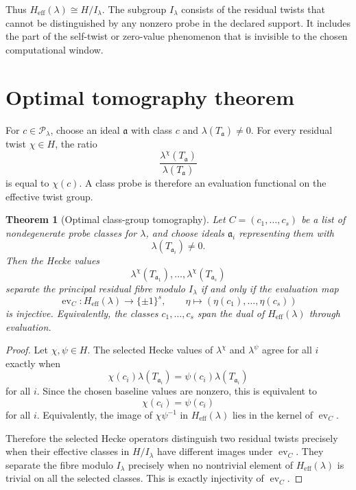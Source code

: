 \documentclass[11pt]{article}
\newtheorem{theorem}{Theorem}[section]
\begin{document}
Thus \(H_{\mathrm{eff}}(\lambda)\cong H/I_\lambda\).  The subgroup \(I_\lambda\) consists of the residual twists that cannot be distinguished by any nonzero probe in the declared support.  It includes the part of the self-twist or zero-value phenomenon that is invisible to the chosen computational window.

\section{Optimal tomography theorem}

For \(c\in\mathcal P_\lambda\), choose an ideal \(\mathfrak a\) with class \(c\) and \(\lambda(T_{\mathfrak a})\neq0\).  For every residual twist \(\chi\in H\), the ratio
\[
\frac{\lambda^\chi(T_{\mathfrak a})}{\lambda(T_{\mathfrak a})}
\]
is equal to \(\chi(c)\).  A class probe is therefore an evaluation functional on the effective twist group.

\begin{theorem}[Optimal class-group tomography]
Let \(C=(c_1,\ldots,c_s)\) be a list of nondegenerate probe classes for \(\lambda\), and choose ideals \(\mathfrak a_i\) representing them with
\[
\lambda(T_{\mathfrak a_i})\neq0.
\]
Then the Hecke values
\[
\lambda^\chi(T_{\mathfrak a_1}),\ldots,\lambda^\chi(T_{\mathfrak a_s})
\]
separate the principal residual fibre modulo \(I_\lambda\) if and only if the evaluation map
\[
\operatorname{ev}_C:
H_{\mathrm{eff}}(\lambda)\longrightarrow\{\pm1\}^s,
\qquad
\eta\longmapsto(\eta(c_1),\ldots,\eta(c_s))
\]
is injective.  Equivalently, the classes \(c_1,\ldots,c_s\) span the dual of \(H_{\mathrm{eff}}(\lambda)\) through evaluation.
\end{theorem}

\begin{proof}
Let \(\chi,\psi\in H\).  The selected Hecke values of \(\lambda^\chi\) and \(\lambda^\psi\) agree for all \(i\) exactly when
\[
\chi(c_i)\lambda(T_{\mathfrak a_i})
=
\psi(c_i)\lambda(T_{\mathfrak a_i})
\]
for all \(i\).  Since the chosen baseline values are nonzero, this is equivalent to
\[
\chi(c_i)=\psi(c_i)
\]
for all \(i\).  Equivalently, the image of \(\chi\psi^{-1}\) in \(H_{\mathrm{eff}}(\lambda)\) lies in the kernel of \(\operatorname{ev}_C\).

Therefore the selected Hecke operators distinguish two residual twists precisely when their effective classes in \(H/I_\lambda\) have different images under \(\operatorname{ev}_C\).  They separate the fibre modulo \(I_\lambda\) precisely when no nontrivial element of \(H_{\mathrm{eff}}(\lambda)\) is trivial on all the selected classes.  This is exactly injectivity of \(\operatorname{ev}_C\).
\end{proof}
\end{document}
